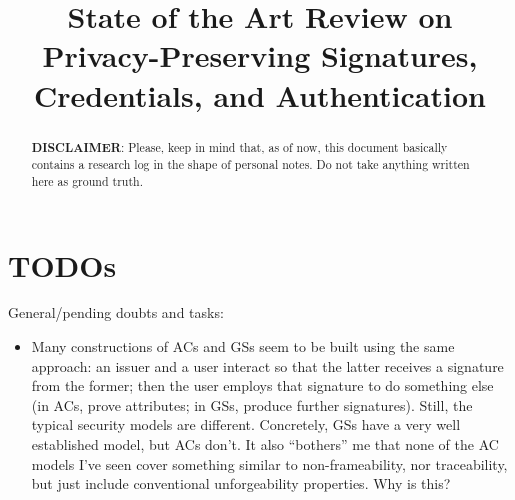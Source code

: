 \documentclass{llncs}%
\title{State of the Art Review on Privacy-Preserving Signatures, Credentials, and Authentication}
\author{}
\begin{document}
\maketitle


\begin{abstract}
	\textbf{DISCLAIMER}: Please, keep in mind that, as of now, this document
	basically contains a research log in the shape of personal notes. Do not take 
	anything written here as ground truth.
\end{abstract}










\section{TODOs}

General/pending doubts and tasks:

\begin{itemize}
\item Many constructions of ACs and GSs seem to be built using the same
  approach: an issuer and a user interact so that the latter receives a signature
  from the former; then the user employs that signature to do something else (in
  ACs, prove attributes; in GSs, produce further signatures). Still, the typical
  security models are different. Concretely, GSs have a very well established
  model, but ACs don't. It also ``bothers'' me that none of the AC models I've
  seen cover something similar to non-frameability, nor traceability, but just
  include conventional unforgeability properties. Why is this?
\end{itemize}



\end{document}
